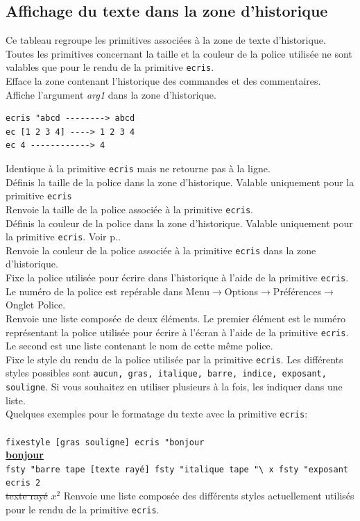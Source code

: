 \subsection{Affichage du texte dans la zone d'historique}
Ce tableau regroupe les primitives associées à la zone de texte d'historique. Toutes les primitives concernant la taille et la couleur de la police utilisée ne sont valables que pour le rendu de la primitive \texttt{ecris}.\\
 Efface la zone contenant l'historique des commandes et des commentaires.\\
 Affiche l'argument \textit{arg1} dans la zone d'historique.\\
\begin{verbatim}
ecris "abcd --------> abcd
ec [1 2 3 4] ----> 1 2 3 4
ec 4 ------------> 4
\end{verbatim}
\noindent
{}
Identique à la primitive \texttt{ecris} mais ne retourne pas à la ligne.\\
Définis la taille de la police dans la zone d'historique. Valable uniquement pour la primitive \texttt{ecris}\\
Renvoie la taille de la police associée à la primitive \texttt{ecris}.\\
Définis la couleur de la police dans la zone d'historique. Valable uniquement pour la primitive \texttt{ecris}. Voir p.\pageref{couleurs}.\\
Renvoie la couleur de la police associée à la primitive \texttt{ecris} dans la zone d'historique.\\
Fixe la police utilisée pour écrire dans l'historique à l'aide de la primitive \texttt{ecris}. Le numéro de la police est repérable dans Menu$\to$Options$\to$Préférences$\to$Onglet Police.\\
Renvoie une liste composée de deux éléments. Le premier élément est le numéro représentant la police utilisée pour écrire à l'écran à l'aide de la primitive \texttt{ecris}. Le second est une liste contenant le nom de cette même police.\\
Fixe le style du rendu de la police utilisée par la primitive \texttt{ecris}. Les différents styles possibles sont \texttt{aucun, gras, italique, barre, indice, exposant, souligne}. Si vous souhaitez en utiliser plusieurs à la fois, les indiquer dans une liste. \\
Quelques exemples pour le formatage du texte avec la primitive \texttt{ecris}:\\ \\
\texttt{fixestyle [gras souligne] ecris "bonjour}\\
\textbf{\underline{bonjour}}\\
\texttt{fsty "barre tape [texte rayé] fsty "italique tape "\textbackslash\ x fsty "exposant ecris 2}\\
\sout{texte rayé} $x^2$
Renvoie une liste composée des différents styles actuellement utilisés pour le rendu de la primitive \texttt{ecris}.\\
